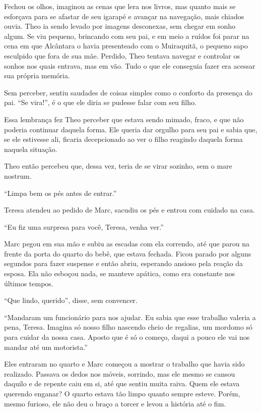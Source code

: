 Fechou os olhos, imaginou as cenas que lera nos livros, mas quanto mais
se esforçava para se afastar de seu igarapé e avançar na navegação, mais
chiados ouvia. Theo ia sendo levado por imagens desconexas, sem chegar
em sonho algum. Se viu pequeno, brincando com seu pai, e em meio a
ruídos foi parar na cena em que Alcântara o havia presenteado com o
Muiraquitã, o pequeno sapo esculpido que fora de sua mãe. Perdido, Theo
tentava navegar e controlar os sonhos nos quais entrava, mas em vão.
Tudo o que ele conseguia fazer era acessar sua própria memória.

Sem perceber, sentiu saudades de coisas simples como o conforto da
presença do pai. ``Se vira!'', é o que ele diria se pudesse falar com
seu filho.

Essa lembrança fez Theo perceber que estava sendo mimado, fraco, e que
não poderia continuar daquela forma. Ele queria dar orgulho para seu pai
e sabia que, se ele estivesse ali, ficaria decepcionado ao ver o filho
reagindo daquela forma naquela situação.

Theo então percebeu que, dessa vez, teria de se virar sozinho, sem o
mare nostrum.

\asterisc


``Limpa bem os pés antes de entrar.''

Teresa atendeu ao pedido de Marc, sacudiu os pés e entrou com cuidado na
casa.

``Eu fiz uma surpresa para você, Teresa, venha ver.''

Marc pegou em sua mão e subiu as escadas com ela correndo, até que parou
na frente da porta do quarto do bebê, que estava fechada. Ficou parado
por alguns segundos para fazer suspense e então abriu, esperando ansioso
pela reação da esposa. Ela não esboçou nada, se manteve apática,
como era constante nos últimos tempos.

``Que lindo, querido'', disse, sem convencer.

``Mandaram um funcionário para nos ajudar. Eu sabia que esse trabalho
valeria a pena, Teresa. Imagina só nosso filho nascendo cheio de
regalias, um mordomo só para cuidar da nossa casa. Aposto que é só o
começo, daqui a pouco ele vai nos mandar até um motorista.''

Eles entraram no quarto e Marc começou a mostrar o trabalho que havia
sido realizado. Passava os dedos nos móveis, sorrindo, mas ele mesmo se
cansou daquilo e de repente caiu em si, até que sentiu muita raiva. Quem
ele estava querendo enganar? O quarto estava tão limpo quanto sempre
esteve. Porém, mesmo furioso, ele não deu o braço a torcer e levou a
história até o fim.

